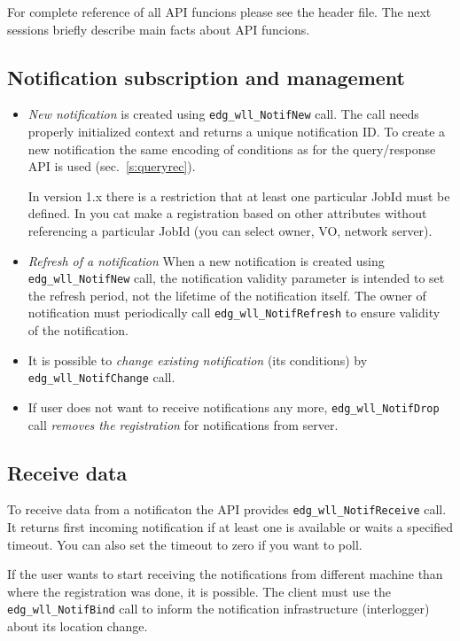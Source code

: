 For complete reference of all API funcions please see the header
file. The next sessions briefly describe main facts about API
funcions.

\subsection{Notification subscription and management}
\begin{itemize}
 \item \emph{New notification} is created using
  \verb'edg_wll_NotifNew' call. The call needs properly initialized
  context and returns a unique notification ID. To create a new
  notification the same encoding of conditions as for the \LB
  query/response API is used (sec.~\ref{s:queryrec}). 

  In version 1.x
  there is a restriction that at least one particular JobId must be
  defined. In  you cat make a registration based on other
  attributes without referencing a particular JobId (you can select
  owner, VO, network server).

 \item \emph {Refresh of a notification} When a new notification is
  created using \verb'edg_wll_NotifNew' call, the notification
  validity parameter is intended to set the refresh period, not the
  lifetime of the notification itself. The owner of notification must
  periodically call \verb'edg_wll_NotifRefresh' to ensure validity of
  the notification.

 \item It is possible to \emph{change existing notification} (its conditions) by
  \verb'edg_wll_NotifChange' call.

 \item If user does not want to receive notifications any more,
  \verb'edg_wll_NotifDrop' call \emph{removes the registration} for
  notifications from \LB server.
\end{itemize}

\subsection{Receive data}
To receive data from a notificaton the API provides
\verb'edg_wll_NotifReceive' call. It returns first incoming
notification if at least one is available or waits a specified timeout. You can
also set the timeout to zero if you want to poll.

If the user wants to start receiving the notifications from different
machine than where the registration was done, it is possible. The
client must use the \verb'edg_wll_NotifBind' call to inform the
notification infrastructure (interlogger) about its location change.

